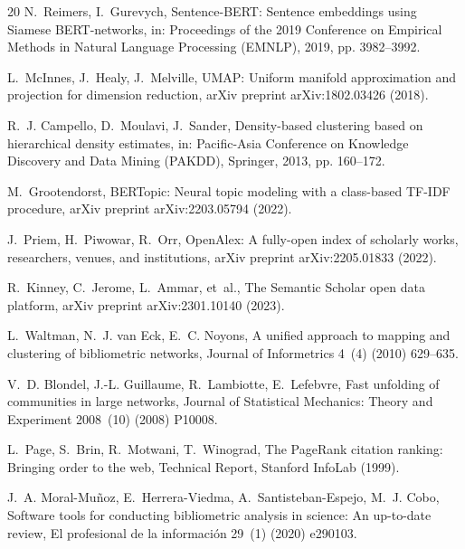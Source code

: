 \documentclass[preprint,12pt]{elsarticle}
\begin{document}
\begin{thebibliography}{20}
N.~Reimers, I.~Gurevych, Sentence-BERT: Sentence embeddings using Siamese BERT-networks, in: Proceedings of the 2019 Conference on Empirical Methods in Natural Language Processing (EMNLP), 2019, pp. 3982--3992.

L.~McInnes, J.~Healy, J.~Melville, UMAP: Uniform manifold approximation and projection for dimension reduction, arXiv preprint arXiv:1802.03426 (2018).

R.~J. Campello, D.~Moulavi, J.~Sander, Density-based clustering based on hierarchical density estimates, in: Pacific-Asia Conference on Knowledge Discovery and Data Mining (PAKDD), Springer, 2013, pp. 160--172.

M.~Grootendorst, BERTopic: Neural topic modeling with a class-based TF-IDF procedure, arXiv preprint arXiv:2203.05794 (2022).

J.~Priem, H.~Piwowar, R.~Orr, OpenAlex: A fully-open index of scholarly works, researchers, venues, and institutions, arXiv preprint arXiv:2205.01833 (2022).

R.~Kinney, C.~Jerome, L.~Ammar, et~al., The Semantic Scholar open data platform, arXiv preprint arXiv:2301.10140 (2023).

L.~Waltman, N.~J. van Eck, E.~C. Noyons, A unified approach to mapping and clustering of bibliometric networks, Journal of Informetrics 4~(4) (2010) 629--635.

V.~D. Blondel, J.-L. Guillaume, R.~Lambiotte, E.~Lefebvre, Fast unfolding of communities in large networks, Journal of Statistical Mechanics: Theory and Experiment 2008~(10) (2008) P10008.

L.~Page, S.~Brin, R.~Motwani, T.~Winograd, The PageRank citation ranking: Bringing order to the web, Technical Report, Stanford InfoLab (1999).

J.~A. Moral-Mu{\~n}oz, E.~Herrera-Viedma, A.~Santisteban-Espejo, M.~J. Cobo, Software tools for conducting bibliometric analysis in science: An up-to-date review, El profesional de la informaci{\'o}n 29~(1) (2020) e290103.

\end{thebibliography}
\end{document}
